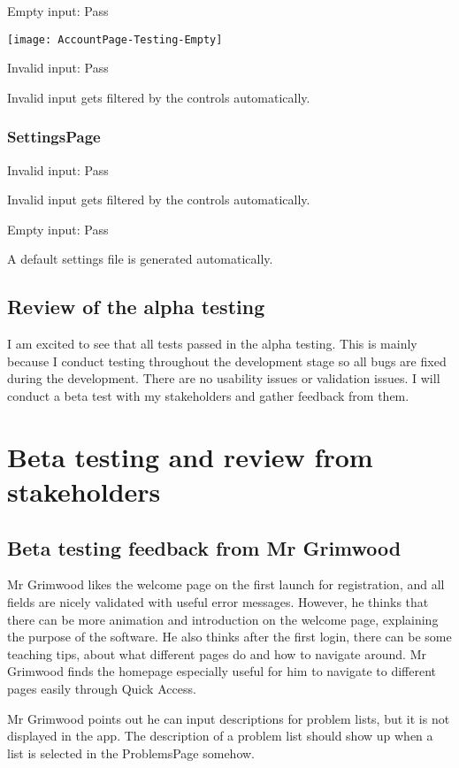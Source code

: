 \documentclass[report.tex]{subfiles}
\begin{document}
Empty input: Pass

\texttt{[image: AccountPage-Testing-Empty]}

Invalid input: Pass

Invalid input gets filtered by the controls automatically.

\subsubsection{SettingsPage}

Invalid input: Pass

Invalid input gets filtered by the controls automatically.

Empty input: Pass

A default settings file is generated automatically.

\subsection{Review of the alpha testing}

I am excited to see that all tests passed in the alpha testing. This is mainly because I conduct testing throughout the development stage so all bugs are fixed during the development. There are no usability issues or validation issues. I will conduct a beta test with my stakeholders and gather feedback from them.

\section{Beta testing and review from stakeholders}

\subsection{Beta testing feedback from Mr Grimwood}

Mr Grimwood likes the welcome page on the first launch for registration, and all fields are nicely validated with useful error messages. However, he thinks that there can be more animation and introduction on the welcome page, explaining the purpose of the software. He also thinks after the first login, there can be some teaching tips, about what different pages do and how to navigate around. Mr Grimwood finds the homepage especially useful for him to navigate to different pages easily through Quick Access.

Mr Grimwood points out he can input descriptions for problem lists, but it is not displayed in the app. The description of a problem list should show up when a list is selected in the ProblemsPage somehow.
\end{document}
